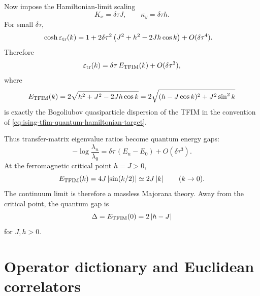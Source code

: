 Now impose the Hamiltonian-limit scaling
\begin{equation}
    K_x=\delta\tau J,
    \qquad
    \kappa_y=\delta\tau h .
\end{equation}
For small $\delta\tau$,
\begin{align}
\label{eq:ising-tfim-dispersion-expansion}
    \cosh\varepsilon_{\rm tr}(k)
    & =
    1
    +2\delta\tau^2
    \left(J^2+h^2-2Jh\cos k\right)
    +O(\delta\tau^4).
\end{align}
Therefore
\begin{equation}
\label{eq:ising-tfim-transfer-to-quantum-dispersion}
    \varepsilon_{\rm tr}(k)
    =
    \delta\tau\,E_{\rm TFIM}(k)+O(\delta\tau^3),
\end{equation}
where
\begin{equation}
\label{eq:ising-tfim-quantum-dispersion}
    E_{\rm TFIM}(k)
    =
    2\sqrt{h^2+J^2-2Jh\cos k}
    =
    2\sqrt{(h-J\cos k)^2+J^2\sin^2 k}
\end{equation}
is exactly the Bogoliubov quasiparticle dispersion of the TFIM in the convention
of \cref{eq:ising-tfim-quantum-hamiltonian-target}.

Thus transfer-matrix eigenvalue ratios become quantum energy gaps:
\begin{equation}
\label{eq:ising-tfim-eigenvalue-gap-map}
    -\log\frac{\lambda_n}{\lambda_0}
    =
    \delta\tau\,(E_n-E_0)+O(\delta\tau^3).
\end{equation}
At the ferromagnetic critical point $h=J>0$,
\begin{equation}
\label{eq:ising-tfim-critical-linear-dispersion}
    E_{\rm TFIM}(k)
    =
    4J\left|\sin(k/2)\right|
    \simeq
    2J\left|k\right|
    \qquad
    (k\to0).
\end{equation}
The continuum limit is therefore a massless Majorana theory.  Away from the
critical point, the quantum gap is
\begin{equation}
\label{eq:ising-tfim-quantum-gap}
    \Delta
    =
    E_{\rm TFIM}(0)
    =
    2\left|h-J\right|
\end{equation}
for $J,h>0$.

\section{Operator dictionary and Euclidean correlators}
\label{sec:ising-tfim-operator-dictionary}

